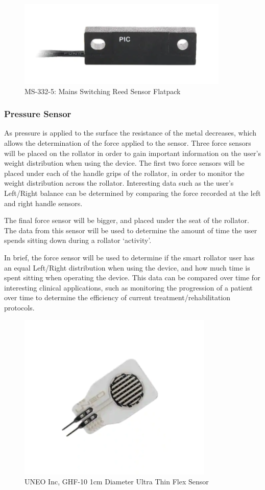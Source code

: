 \documentclass{article}
\begin{document}
\begin{figure}[!h]
    \centering
    \includegraphics{MS_3225.png}
    \caption{MS-332-5: Mains Switching Reed Sensor Flatpack}
    \label{fig:6}
\end{figure}

\subsubsection{Pressure Sensor}
As pressure is applied to the surface the resistance of the metal decreases, which allows the determination of the force applied to the sensor. Three force sensors will be placed on the rollator in order to gain important information on the user's weight distribution when using the device. The first two force sensors will be placed under each of the handle grips of the rollator, in order to monitor the weight distribution across the rollator. Interesting data such as the user’s Left/Right balance can be determined by comparing the force recorded at the left and right handle sensors. 

The final force sensor will be bigger, and placed under the seat of the rollator. The data from this sensor will be used to determine the amount of time the user spends sitting down during a rollator ‘activity’. 

In brief, the force sensor will be used to determine if the smart rollator user has an equal Left/Right distribution when using the device, and how much time is spent sitting when operating the device. This data can be compared over time for interesting clinical applications, such as monitoring the progression of a patient over time to determine the efficiency of current treatment/rehabilitation protocols. 
\begin{figure}[!h]
    \centering
    \includegraphics[scale = 0.7]{GHF_10.png}
    \caption{UNEO Inc, GHF-10 1cm Diameter Ultra Thin Flex Sensor
}
    \label{fig:7}
\end{figure}
\end{document}
